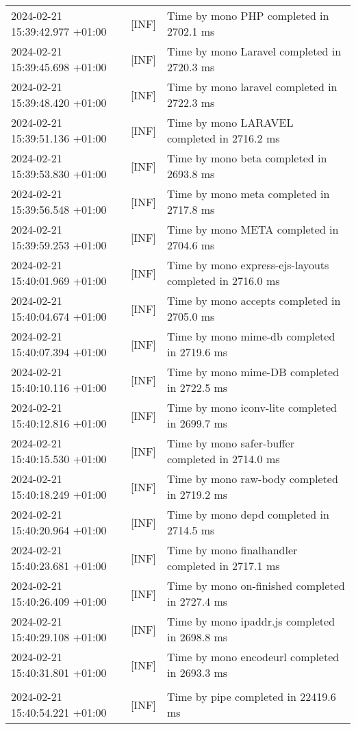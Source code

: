 {{\begin{tabularx}{\textwidth}{|l|l|X|}
                    2024-02-21 15:39:42.977 +01:00 & [INF] & Time by mono PHP completed in 2702.1 ms \\
                    2024-02-21 15:39:45.698 +01:00 & [INF] & Time by mono Laravel completed in 2720.3 ms \\
                    2024-02-21 15:39:48.420 +01:00 & [INF] & Time by mono laravel completed in 2722.3 ms \\
                    2024-02-21 15:39:51.136 +01:00 & [INF] & Time by mono LARAVEL completed in 2716.2 ms \\
                    2024-02-21 15:39:53.830 +01:00 & [INF] & Time by mono beta completed in 2693.8 ms \\
                    2024-02-21 15:39:56.548 +01:00 & [INF] & Time by mono meta completed in 2717.8 ms \\
                    2024-02-21 15:39:59.253 +01:00 & [INF] & Time by mono META completed in 2704.6 ms \\
                    2024-02-21 15:40:01.969 +01:00 & [INF] & Time by mono express-ejs-layouts completed in 2716.0 ms \\
                    2024-02-21 15:40:04.674 +01:00 & [INF] & Time by mono accepts completed in 2705.0 ms \\
                    2024-02-21 15:40:07.394 +01:00 & [INF] & Time by mono mime-db completed in 2719.6 ms \\
                    2024-02-21 15:40:10.116 +01:00 & [INF] & Time by mono mime-DB completed in 2722.5 ms \\
                    2024-02-21 15:40:12.816 +01:00 & [INF] & Time by mono iconv-lite completed in 2699.7 ms \\
                    2024-02-21 15:40:15.530 +01:00 & [INF] & Time by mono safer-buffer completed in 2714.0 ms \\
                    2024-02-21 15:40:18.249 +01:00 & [INF] & Time by mono raw-body completed in 2719.2 ms \\
                    2024-02-21 15:40:20.964 +01:00 & [INF] & Time by mono depd completed in 2714.5 ms \\
                    2024-02-21 15:40:23.681 +01:00 & [INF] & Time by mono finalhandler completed in 2717.1 ms \\
                    2024-02-21 15:40:26.409 +01:00 & [INF] & Time by mono on-finished completed in 2727.4 ms \\
                    2024-02-21 15:40:29.108 +01:00 & [INF] & Time by mono ipaddr.js completed in 2698.8 ms \\
                    2024-02-21 15:40:31.801 +01:00 & [INF] & Time by mono encodeurl completed in 2693.3 ms \\
                    & & \\
                    2024-02-21 15:40:54.221 +01:00 & [INF] & Time by pipe completed in 22419.6 ms \\
                    \hline
                \end{tabularx}
            }
        }

